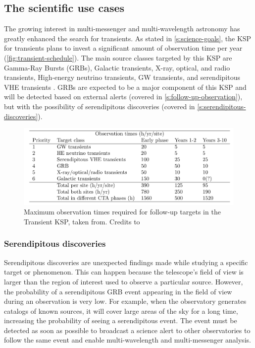 \subsection{The scientific use cases}
\label{s:contribution-1-use-cases}
The growing interest in multi-messenger and multi-wavelength astronomy has greatly enhanced the search for transients. As stated in \autoref{s:science-goals}, the KSP for transients plans to invest a significant amount of observation time per year (\autoref{fig:transient-schedule}). The main source classes targeted by this KSP are Gamma-Ray Bursts (GRBs), Galactic transients, X-ray, optical, and radio transients, High-energy neutrino transients, GW transients, and serendipitous VHE transients \cite{ScienceWithCherenkovTelescopeArray2018}. GRBs are expected to be a major component of this KSP and will be detected based on external alerts (covered in \autoref{s:follow-up-observation}), but with the possibility of serendipitous discoveries (covered in \autoref{s:serendipitous-discoveries}).
\begin{figure}[t]
\centering
\includegraphics[width=0.9\linewidth]{figures/introduction/transients-schedule.png}
\caption{Maximum observation times required for follow-up targets in the Transient KSP, taken from. Credits to \cite{di2020detection}}
\label{fig:transient-schedule}
\end{figure}

\subsubsection{Serendipitous discoveries}
\label{s:serendipitous-discoveries}
Serendipitous discoveries are unexpected findings made while studying a specific target or phenomenon. This can happen because the telescope's field of view is larger than the region of interest used to observe a particular source. However, the probability of a serendipitous GRB event appearing in the field of view during an observation is very low. For example, when the observatory generates catalogs of known sources, it will cover large areas of the sky for a long time, increasing the probability of seeing a serendipitous event. The event must be detected as soon as possible to broadcast a science alert to other observatories to follow the same event and enable multi-wavelength and multi-messenger analysis. 

